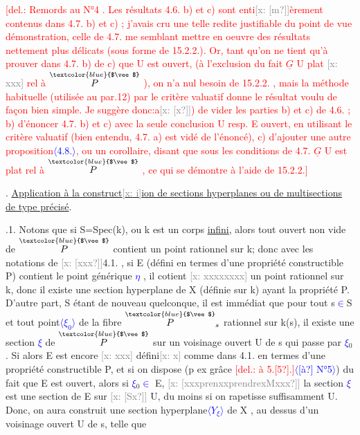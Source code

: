 \documentclass[11pt]{article}
\newcommand{\scanpage}[1]{\par\bigskip\noindent{\small\sffamily[scan #1]}\par}
\newcommand{\mspage}[1]{{\small\sffamily[p.\,#1]}}
\newcommand{\hand}[1]{\textcolor{blue}{#1}}
\let\over\relax
\newcommand{\over}[2]{\textcolor{gray}{#1}\textcolor{blue}{\ensuremath{^{\!\nearrow}}#2}}
\newcommand{\inserted}[2][]{\textcolor{blue}{$\langle$#2$\rangle$}}
\newcommand{\deleted}[1]{\textcolor{red}{[\textsf{del.:} #1]}}
\newcommand{\xout}[1]{\textcolor{gray}{[\textsf{x:} #1]}}
\newcommand{\uline}[1]{\underline{#1}}
\newcommand{\unsure}[1]{[#1?]}
\begin{document}
\clearpage
\scanpage{25/27}
\mspage{23}

\deleted{Remords au N°4 . Les résultats 4.6. b) et c) sont enti\xout{\unsure{m}}èrement
contenus dans 4.7. b) et c) ; j'avais cru une telle redite justifiable du
point de vue démonstration, celle de 4.7. me semblant mettre en oeuvre des
résultats nettement plus délicats (sous forme de 15.2.2.). Or, tant qu'on
ne tient qu'à prouver dans 4.7. b) de c) que U est ouvert, (à l'exclusion
du fait $\underline{G}$ U plat \xout{xxx} rel à $\overset{\hand{$\vee$}}{P}$ ), on n'a nul besoin de 15.2.2. , mais la
méthode habituelle (utilisée au par.12) par le critère valuatif donne le
résultat voulu de façon bien simple. Je suggère donc:a\xout{\unsure{x}}) de vider les
parties b) et c) de 4.6. ; b) d'énoncer 4.7. b) et c) avec la seule
conclusion U resp. E ouvert, en utilisant le critère valuatif (bien entendu,
4.7. a) est vidé de l'énoncé), c) d'ajouter une autre proposition\inserted[typed]{4.8.}, ou un
corollaire, disant que sous les conditions de 4.7. $\underline{G}$ U est plat rel à $\overset{\hand{$\vee$}}{P}$ ,
ce qui se démontre à l'aide de 15.2.2.}

\over{\unsure{5}}{7}. \uline{Application à la construct\xout{i}ion de sections hyperplanes ou de multisections
de type précisé}.

\over{\unsure{5}}{7}.1. Notons que si S=Spec(k), ou k est un corps \uline{infini}, alors tout ouvert
non vide de $\overset{\hand{$\vee$}}{P}$ contient un point rationnel sur k; donc avec les notations de
\xout{\unsure{xxx}}4.1. , si E (défini en termes d'une propriété constructible P) contient
le point générique \hand{$\eta$} , il cotient \xout{xxxxxxxx} un point rationnel sur k, donc
il existe une section hyperplane de X (définie sur k) ayant la propriété P.
D'autre part, S étant de nouveau quelconque, il est immédiat que pour tout
s\hand{$\in$}S et tout point\inserted{$\xi_0$} de la fibre $\overset{\hand{$\vee$}}{P}_s$ rationnel sur k(s), il existe une section
\hand{$\xi$} de $\overset{\hand{$\vee$}}{P}$ sur un voisinage ouvert U de s qui passe par \hand{$\xi$}$_0$ . Si alors E est
encore \xout{xxx} défini\xout{x} comme dans 4.1. en termes d'une propriété constructible
P, et si on dispose (p ex grâce \deleted{à 5.\unsure{5}.}\inserted{\unsure{à} N°5}) du fait que E est ouvert, alors
si \hand{$\xi$}$_0$\hand{$\in$} E, \xout{\unsure{xxxprenxxprendrexMxxx}} la section \hand{$\xi$} est une section de E sur \xout{\unsure{Sx}}
U, du moins si on rapetisse suffisamment U. Donc, on aura construit une
section hyperplane\inserted{$Y_\xi$} de X , au dessus d'un voisinage ouvert U de s, telle que
\end{document}
